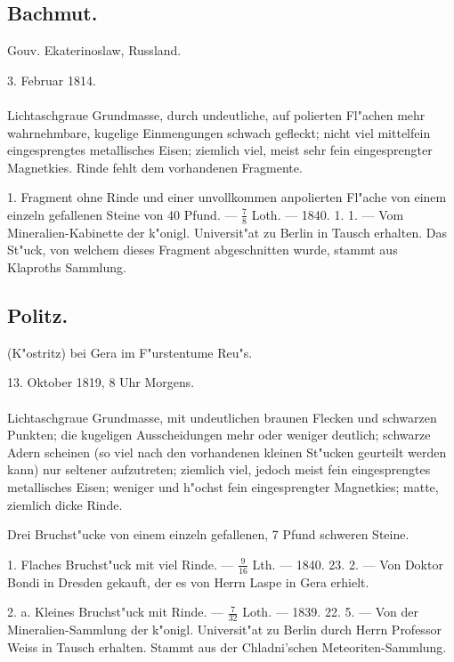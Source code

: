 \documentclass[a4paper, 11pt, oneside, polutonikogreek, german]{article}
\begin{document}
\subsection{Bachmut.}
\begin{center}
\small
Gouv. Ekaterinoslaw, Russland.

3. Februar 1814.
\end{center}
\paragraph{}
Lichtaschgraue Grundmasse, durch undeutliche, auf polierten Fl"achen mehr wahrnehmbare, kugelige Einmengungen schwach gefleckt; nicht viel mittelfein eingesprengtes metallisches Eisen; ziemlich viel, meist sehr fein eingesprengter Magnetkies. Rinde fehlt dem vorhandenen Fragmente.

1. Fragment ohne Rinde und einer unvollkommen anpolierten Fl"ache von einem einzeln gefallenen Steine von 40 Pfund. --- $\frac{7}{8}$ Loth. --- 1840. 1. 1. --- Vom Mineralien-Kabinette der k"onigl. Universit"at zu Berlin in Tausch erhalten. Das St"uck, von welchem dieses Fragment abgeschnitten wurde, stammt aus Klaproths Sammlung.
\subsection{Politz.}
\begin{center}
\small
(K"ostritz) bei Gera im F"urstentume Reu"s.

13. Oktober 1819, 8 Uhr Morgens.
\end{center}
\paragraph{}
Lichtaschgraue Grundmasse, mit undeutlichen braunen Flecken und schwarzen Punkten; die kugeligen Ausscheidungen mehr oder weniger deutlich; schwarze Adern scheinen (so viel nach den vorhandenen kleinen St"ucken geurteilt werden kann) nur seltener aufzutreten; ziemlich viel, jedoch meist fein eingesprengtes metallisches Eisen; weniger und h"ochst fein eingesprengter Magnetkies; matte, ziemlich dicke Rinde.

Drei Bruchst"ucke von einem einzeln gefallenen, 7 Pfund schweren Steine.

1. Flaches Bruchst"uck mit viel Rinde. --- $\frac{9}{16}$ Lth. --- 1840. 23. 2. --- Von Doktor Bondi in Dresden gekauft, der es von Herrn Laspe in Gera erhielt.

2. a. Kleines Bruchst"uck mit Rinde. --- $\frac{7}{32}$ Loth. --- 1839. 22. 5. --- Von der Mineralien-Sammlung der k"onigl. Universit"at zu Berlin durch Herrn Professor Weiss in Tausch erhalten. Stammt aus der Chladni'schen Meteoriten-Sammlung.
\end{document}
